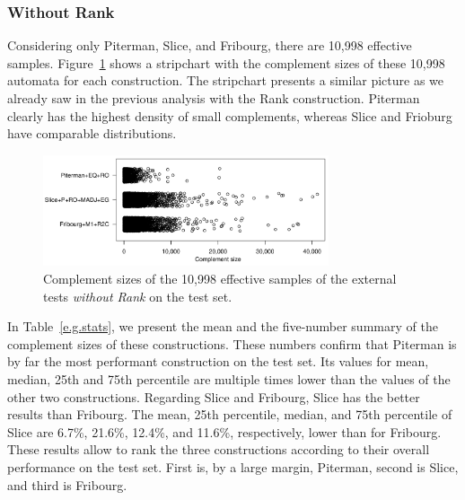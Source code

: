 
\subsubsection{Without Rank}
Considering only Piterman, Slice, and Fribourg, there are 10,998 effective samples. Figure~\ref{e.g.stripchart} shows a stripchart with the complement sizes of these 10,998 automata for each construction. The stripchart presents a similar picture as we already saw in the previous analysis with the Rank construction. Piterman clearly has the highest density of small complements, whereas Slice and Frioburg have comparable distributions.



\begin{figure}[ht]
\centering
\includegraphics[width=0.75\textwidth]{figures/r/external/goal/s.stripchart.pdf}
\caption{Complement sizes of the 10,998 effective samples of the external tests \textit{without Rank} on the \goal{} test set.}
\label{e.g.stripchart}
\end{figure}

In Table~\ref{e.g.stats}, we present the mean and the five-number summary of the complement sizes of these constructions. These numbers confirm that Piterman is by far the most performant construction on the \goal{} test set. Its values for mean, median, 25th and 75th percentile are multiple times lower than the values of the other two constructions.  Regarding Slice and Fribourg, Slice has the better results than Fribourg. The mean, 25th percentile, median, and 75th percentile of Slice are 6.7\%, 21.6\%, 12.4\%, and 11.6\%, respectively, lower than for Fribourg. These results allow to rank the three constructions according to their overall performance on the \goal{} test set. First is, by a large margin, Piterman, second is Slice, and third is Fribourg.

